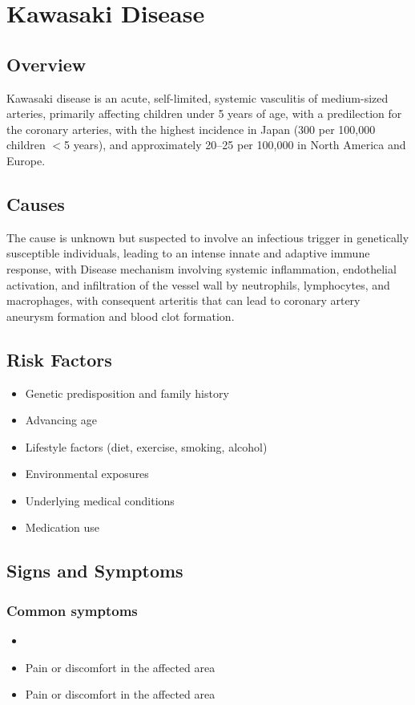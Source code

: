 \chapter{Kawasaki Disease}
\label{sec:Kawasaki Disease}

\section{Overview}
Kawasaki disease is an acute, self-limited, systemic vasculitis of medium-sized arteries, primarily affecting children under 5 years of age, with a predilection for the coronary arteries, with the highest incidence in Japan (300 per 100,000 children $<$5 years), and approximately 20--25 per 100,000 in North America and Europe.
\section{Causes}
The cause is unknown but suspected to involve an infectious trigger in genetically susceptible individuals, leading to an intense innate and adaptive immune response, with Disease mechanism involving systemic inflammation, endothelial activation, and infiltration of the vessel wall by neutrophils, lymphocytes, and macrophages, with consequent arteritis that can lead to coronary artery aneurysm formation and blood clot formation.     
\section{Risk Factors}

\begin{itemize}[noitemsep]
  \item Genetic predisposition and family history
  \item Advancing age
  \item Lifestyle factors (diet, exercise, smoking, alcohol)
  \item Environmental exposures
  \item Underlying medical conditions
  \item Medication use
\end{itemize}
\section{Signs and Symptoms}

\subsection{Common symptoms}
\begin{itemize}[noitemsep]
  \item \item Pain or discomfort in the affected area    \item Pain or discomfort in the affected area
  \end{itemize}

